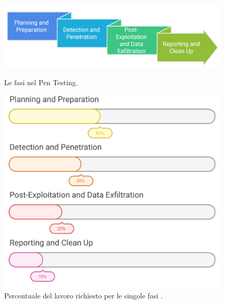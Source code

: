        \begin{figure}[h!]
            \centering
                \begin{minipage}{0.5\textwidth}
                    \centering
                    \includegraphics[width=1.0\textwidth]{Immagini/PT_phases_pentest_timeline.png}
                    \caption{Le fasi nel Pen Testing.}
                \end{minipage}\hfill
                \begin{minipage}{0.5\textwidth}
                    \centering
                    \includegraphics[width=1.0\textwidth]{Immagini/PT_workload_percentage_tablets.png}
                    \caption{Percentuale del lavoro richiesto per le singole fasi \cite{VAPT_Techniques}.}
                \end{minipage}
        \end{figure}

